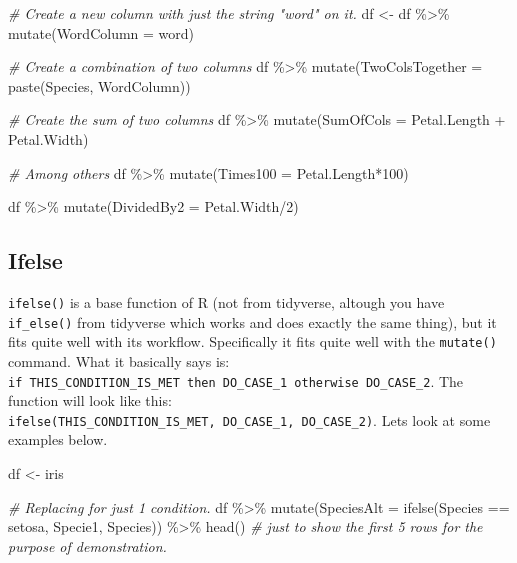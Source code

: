 \documentclass[
]{book}
\newenvironment{Shaded}{\begin{snugshade}}{\end{snugshade}}
\newcommand{\AttributeTok}[1]{\textcolor[rgb]{0.77,0.63,0.00}{#1}}
\newcommand{\CommentTok}[1]{\textcolor[rgb]{0.56,0.35,0.01}{\textit{#1}}}
\newcommand{\DecValTok}[1]{\textcolor[rgb]{0.00,0.00,0.81}{#1}}
\newcommand{\FunctionTok}[1]{\textcolor[rgb]{0.00,0.00,0.00}{#1}}
\newcommand{\NormalTok}[1]{#1}
\newcommand{\OtherTok}[1]{\textcolor[rgb]{0.56,0.35,0.01}{#1}}
\newcommand{\SpecialCharTok}[1]{\textcolor[rgb]{0.00,0.00,0.00}{#1}}
\newcommand{\StringTok}[1]{\textcolor[rgb]{0.31,0.60,0.02}{#1}}
\begin{document}
\begin{Shaded}
\begin{Highlighting}[]
\CommentTok{\# Create a new column with just the string "word" on it.}
\NormalTok{df }\OtherTok{\textless{}{-}}\NormalTok{ df }\SpecialCharTok{\%\textgreater{}\%} 
  \FunctionTok{mutate}\NormalTok{(}\AttributeTok{WordColumn =} \StringTok{\textquotesingle{}word\textquotesingle{}}\NormalTok{)}

\CommentTok{\# Create a combination of two columns}
\NormalTok{df }\SpecialCharTok{\%\textgreater{}\%} 
  \FunctionTok{mutate}\NormalTok{(}\AttributeTok{TwoColsTogether =} \FunctionTok{paste}\NormalTok{(Species, WordColumn))}

\CommentTok{\# Create the sum of two columns}
\NormalTok{df }\SpecialCharTok{\%\textgreater{}\%} 
  \FunctionTok{mutate}\NormalTok{(}\AttributeTok{SumOfCols =}\NormalTok{ Petal.Length }\SpecialCharTok{+}\NormalTok{ Petal.Width)}

\CommentTok{\# Among others}
\NormalTok{df }\SpecialCharTok{\%\textgreater{}\%} 
  \FunctionTok{mutate}\NormalTok{(}\AttributeTok{Times100 =}\NormalTok{ Petal.Length}\SpecialCharTok{*}\DecValTok{100}\NormalTok{)}

\NormalTok{df }\SpecialCharTok{\%\textgreater{}\%} 
  \FunctionTok{mutate}\NormalTok{(}\AttributeTok{DividedBy2 =}\NormalTok{ Petal.Width}\SpecialCharTok{/}\DecValTok{2}\NormalTok{)}
\end{Highlighting}
\end{Shaded}

\hypertarget{ifelse}{%
\subsection{Ifelse}\label{ifelse}}

\texttt{ifelse()} is a base function of R (not from tidyverse, altough you have \texttt{if\_else()} from tidyverse which works and does exactly the same thing), but it fits quite well with its workflow.
Specifically it fits quite well with the \texttt{mutate()} command.
What it basically says is: \texttt{if\ THIS\_CONDITION\_IS\_MET\ then\ DO\_CASE\_1\ otherwise\ DO\_CASE\_2}.
The function will look like this: \texttt{ifelse(THIS\_CONDITION\_IS\_MET,\ DO\_CASE\_1,\ DO\_CASE\_2)}.
Lets look at some examples below.

\begin{Shaded}
\begin{Highlighting}[]
\NormalTok{df }\OtherTok{\textless{}{-}}\NormalTok{ iris}

\CommentTok{\# Replacing for just 1 condition.}
\NormalTok{df }\SpecialCharTok{\%\textgreater{}\%} 
  \FunctionTok{mutate}\NormalTok{(}\AttributeTok{SpeciesAlt =} \FunctionTok{ifelse}\NormalTok{(Species }\SpecialCharTok{==} \StringTok{\textquotesingle{}setosa\textquotesingle{}}\NormalTok{, }\StringTok{\textquotesingle{}Specie1\textquotesingle{}}\NormalTok{, Species)) }\SpecialCharTok{\%\textgreater{}\%} 
  \FunctionTok{head}\NormalTok{()  }\CommentTok{\# just to show the first 5 rows for the purpose of demonstration.}
\end{Highlighting}
\end{Shaded}
\end{document}
